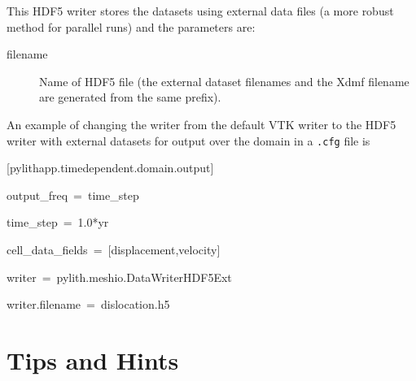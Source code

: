 This HDF5 writer stores the datasets using external data files (a
more robust method for parallel runs) and the parameters are:
\begin{description}
\item [{filename}] Name of HDF5 file (the external dataset filenames and
the Xdmf filename are generated from the same prefix).
\end{description}
An example of changing the writer from the default VTK writer to the
HDF5 writer with external datasets for output over the domain in a
\texttt{.cfg} file is
\begin{lyxcode}
{[}pylithapp.timedependent.domain.output{]}

output\_freq~=~time\_step

time\_step~=~1.0{*}yr

cell\_data\_fields~=~{[}displacement,velocity{]}

writer~=~pylith.meshio.DataWriterHDF5Ext

writer.filename~=~dislocation.h5
\end{lyxcode}

\section{Tips and Hints\label{sec:Tips:Hints}}


